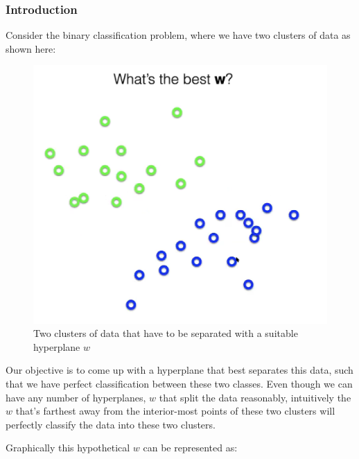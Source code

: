 \documentclass[11pt]{article}
\begin{document}
\subsubsection{Introduction}
Consider the binary classification problem, where we have two clusters of data as shown here:

\begin{figure}[h]
    \centering
    \includegraphics[scale = 0.25]{figures/cluster.png}
    \caption{Two clusters of data that have to be separated with a suitable hyperplane $w$}
    \label{fig:DataClusters}
\end{figure}

Our objective is to come up with a hyperplane that best separates this data, such that we have perfect classification between these two classes. Even though we can have any  number of hyperplanes, $w$ that split the data reasonably, intuitively the $w$ that's farthest away from the interior-most points of these two clusters will perfectly classify the data into these two clusters.

Graphically this hypothetical $w$ can be represented as:
\end{document}

